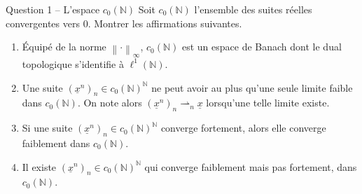 \documentclass[11pt,a4paper]{article}
\newcommand{\N}{\mathbb{N}}
\newcommand{\norm}[1]{\left\|#1\right\|}
\newcommand{\wk}{\rightharpoonup}
\theoremstyle{definition}
\newcommand{\su}[1]{\underline{#1}}
\newcommand{\lun}{\ell^1(\N)}
\newcommand{\cz}{c_0(\N)}
\begin{document}
\begin{exo}{Question 1 -- L'espace $c_0(\N)$}
Soit $\cz$ l'ensemble des suites réelles convergentes vers $0$. Montrer les affirmations suivantes.
\begin{enumerate}[label=(\alph*)]
  \item Équipé de la norme $\norm\cdot_\infty$, $\cz$ est un espace de Banach dont le dual topologique s'identifie à $\lun$.
  \item Une suite $(\su x^n)_n\in\cz^\N$ ne peut avoir au plus qu'une seule limite faible dans $\cz$. On note alors $(\su x^n)_n\wk_n\su x$ lorsqu'une telle limite existe.
  \item Si une suite $(\su x^n)_n\in\cz^\N$ converge fortement, alors elle converge faiblement dans $\cz$.
  \item Il existe $(\su x^n)_n\in\cz^\N$ qui converge faiblement mais pas fortement, dans $\cz$.
\end{enumerate}
\end{exo}
\end{document}

